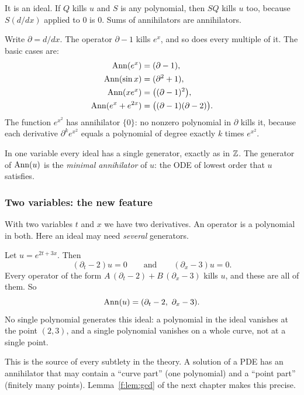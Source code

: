 It is an ideal. If $Q$ kills $u$ and $S$ is any polynomial, then $SQ$ kills $u$ too, because $S(d/dx)$ applied to $0$ is $0$. Sums of annihilators are annihilators.

\begin{example}
Write $\partial=d/dx$. The operator $\partial-1$ kills $e^x$, and so does every multiple of it. The basic cases are:
\begin{align*}
\operatorname{Ann}(e^x)&=(\partial-1),\\
\operatorname{Ann}(\sin x)&=(\partial^2+1),\\
\operatorname{Ann}(xe^x)&=\big((\partial-1)^2\big),\\
\operatorname{Ann}(e^x+e^{2x})&=\big((\partial-1)(\partial-2)\big).
\end{align*}
The function $e^{x^2}$ has annihilator $\{0\}$: no nonzero polynomial in $\partial$ kills it, because each derivative $\partial^ke^{x^2}$ equals a polynomial of degree exactly $k$ times $e^{x^2}$.
\end{example}

In one variable every ideal has a single generator, exactly as in $\mathbb{Z}$. The generator of $\operatorname{Ann}(u)$ is the \emph{minimal annihilator} of $u$: the ODE of lowest order that $u$ satisfies.

\subsubsection{Two variables: the new feature}

With two variables $t$ and $x$ we have two derivatives. An operator is a polynomial in both. Here an ideal may need \emph{several} generators.

\begin{example}
Let $u=e^{2t+3x}$. Then
\[
(\partial_t-2)u=0\qquad\text{and}\qquad(\partial_x-3)u=0 .
\]
Every operator of the form $A\,(\partial_t-2)+B\,(\partial_x-3)$ kills $u$, and these are all of them. So
\[
\operatorname{Ann}(u)=(\partial_t-2,\ \partial_x-3).
\]
No single polynomial generates this ideal: a polynomial in the ideal vanishes at the point $(2,3)$, and a single polynomial vanishes on a whole curve, not at a single point.
\end{example}

This is the source of every subtlety in the theory. A solution of a PDE has an annihilator that may contain a ``curve part'' (one polynomial) and a ``point part'' (finitely many points). Lemma~\ref{f:lem:gcd} of the next chapter makes this precise.

